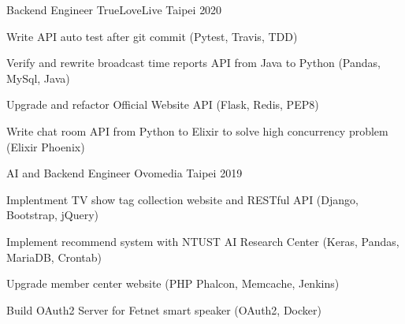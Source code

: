 

\begin{cventries}

  \cventry
    {Backend Engineer} %
    {TrueLoveLive} %
    {Taipei} %
    {2020} %
    {
      \begin{cvitems} %
        \item {Write API auto test after git commit (Pytest, Travis, TDD)}
        \item {Verify and rewrite broadcast time reports API from Java to Python (Pandas, MySql, Java)}
        \item {Upgrade and refactor Official Website API (Flask, Redis, PEP8)}
        \item {Write chat room API from Python to Elixir to solve high concurrency problem (Elixir Phoenix)}
      \end{cvitems}
    }

  \cventry
    {AI and Backend Engineer} %
    {Ovomedia} %
    {Taipei} %
    {2019} %
    {
      \begin{cvitems} %
        \item {Implentment TV show tag collection website and RESTful API (Django, Bootstrap, jQuery)}
        \item {Implement recommend system with NTUST AI Research Center (Keras, Pandas, MariaDB, Crontab)}
        \item {Upgrade member center website (PHP Phalcon, Memcache, Jenkins)}
        \item {Build OAuth2 Server for Fetnet smart speaker (OAuth2, Docker)}
      \end{cvitems}
    }

\end{cventries}
